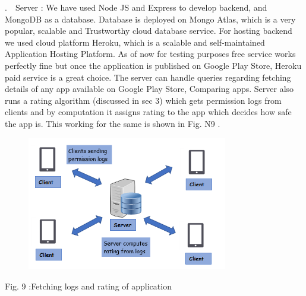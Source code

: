 \documentclass[12pt]{report}
\renewcommand{\_}{\kern-1.5pt\textunderscore\kern-1.5pt}
\begin{document}
\begin{multicols}{2}
\begin{justify}
\end{justify}
\begin{justify}
{\fontsize{10pt}{12.0pt}.\ \ Server : We have used Node JS and Express to develop backend, and MongoDB as a database. Database is deployed on Mongo Atlas, which is a very popular, scalable and Trustworthy cloud database service. For hosting backend we used cloud platform Heroku, which is a scalable and self-maintained Application Hosting Platform. As of now for testing purposes free service works perfectly fine but once the application is published on Google Play Store, Heroku paid  service is a great choice. The server can handle queries regarding fetching details of any app available on Google Play Store, Comparing apps. Server also runs a rating algorithm (discussed in sec 3) which gets permission logs from clients and by computation it assigns rating to the app which decides how safe the app is. This working for the same is shown in Fig. N9 .\par}
\end{justify}



\begin{figure}[H]
	\begin{Center}
		\includegraphics[width=3.45in,height=2.31in]{./media/image2.png}
	\end{Center}
\end{figure}




\vspace{\baselineskip}\begin{Center}
{\fontsize{10pt}{12.0pt}\selectfont Fig. 9 :Fetching logs and rating of application}
\end{Center}

\vspace{\baselineskip}
\setlength{\parskip}{0.0pt}


\end{multicols}
\end{document}

